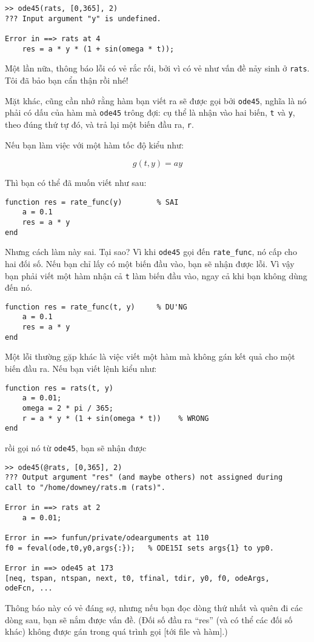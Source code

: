 \documentclass[12pt]{book}
\begin{document}
\begin{verbatim}
>> ode45(rats, [0,365], 2)
??? Input argument "y" is undefined.

Error in ==> rats at 4
    res = a * y * (1 + sin(omega * t));
\end{verbatim}
%
Một lần nữa, thông báo lỗi có vẻ rắc rối, bởi vì có vẻ như vấn đề
nảy sinh ở {\tt rats}.  Tôi đã bảo bạn cẩn thận rồi nhé!

Mặt khác, cũng cần nhớ rằng hàm bạn viết ra sẽ được gọi bởi
{\tt ode45}, nghĩa là nó phải có dấu của hàm mà {\tt ode45}
trông đợi: cụ thể là nhận vào hai biến, {\tt t} và {\tt y},
theo đúng thứ tự đó, và trả lại một biến đầu ra, {\tt r}.

Nếu bạn làm việc với một hàm tốc độ kiểu như:

\[ g(t, y) = a y \]

Thì bạn có thể đã muốn viết như sau:

\begin{verbatim}
function res = rate_func(y)        % SAI
    a = 0.1
    res = a * y
end
\end{verbatim}
%
Nhưng cách làm này sai. Tại sao? Vì khi {\tt ode45} gọi đến
\verb#rate_func#, nó cấp cho hai đối số. Nếu bạn chỉ lấy có
một biến đầu vào, bạn sẽ nhận được lỗi. Vì vậy bạn phải viết
một hàm nhận cả {\tt t} làm biến đầu vào, ngay cả khi bạn
không dùng đến nó.

\begin{verbatim}
function res = rate_func(t, y)     % DU'NG
    a = 0.1
    res = a * y
end
\end{verbatim}
%
Một lỗi thường gặp khác là việc viết một hàm mà không gán
kết quả cho một biến đầu ra. Nếu bạn viết lệnh kiểu như:

\begin{verbatim}
function res = rats(t, y)
    a = 0.01;
    omega = 2 * pi / 365;
    r = a * y * (1 + sin(omega * t))    % WRONG
end
\end{verbatim}
%
\noindent rồi gọi nó từ {\tt ode45}, bạn sẽ nhận được

\begin{verbatim}
>> ode45(@rats, [0,365], 2)
??? Output argument "res" (and maybe others) not assigned during 
call to "/home/downey/rats.m (rats)".

Error in ==> rats at 2
    a = 0.01;

Error in ==> funfun/private/odearguments at 110
f0 = feval(ode,t0,y0,args{:});   % ODE15I sets args{1} to yp0.

Error in ==> ode45 at 173
[neq, tspan, ntspan, next, t0, tfinal, tdir, y0, f0, odeArgs, 
odeFcn, ...
\end{verbatim}
%
Thông báo này có vẻ đáng sợ, nhưng nếu bạn đọc dòng thứ nhất
và quên đi các dòng sau, bạn sẽ nắm được vấn đề. (Đối số đầu ra
``res'' (và có thể các đối số khác) không được gán trong quá trình
gọi [tới file và hàm].)
\end{document}
